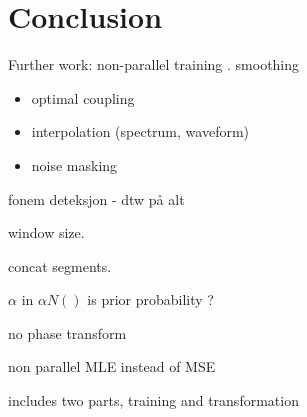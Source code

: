 \chapter{Conclusion} %
\label{cha:conclusion}
Further work: non-parallel training \cite{mouchtaris06}.
smoothing
\begin{itemize}
	\item optimal coupling
	\item interpolation (spectrum, waveform)
	\item noise masking
\end{itemize}

fonem deteksjon - dtw på alt

window size.

concat segments.

$\alpha$ in $\alpha N()$ is prior probability ?

no phase transform

non parallel \cite{ye06} MLE instead of MSE

includes two parts, training and transformation
